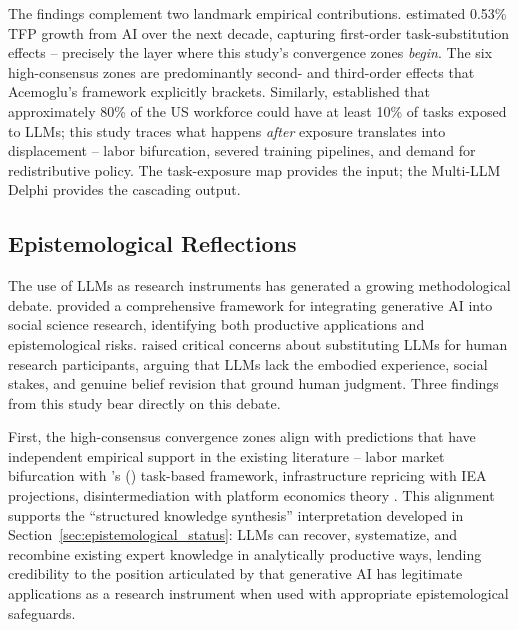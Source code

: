 \documentclass[preprint,review,12pt]{elsarticle}
\begin{document}
The findings complement two landmark empirical contributions. \citet{acemoglu2024simplemacro} estimated 0.53\% TFP growth from AI over the next decade, capturing first-order task-substitution effects -- precisely the layer where this study's convergence zones \textit{begin}. The six high-consensus zones are predominantly second- and third-order effects that Acemoglu's framework explicitly brackets. Similarly, \citet{eloundou2023gpts} established that approximately 80\% of the US workforce could have at least 10\% of tasks exposed to LLMs; this study traces what happens \textit{after} exposure translates into displacement -- labor bifurcation, severed training pipelines, and demand for redistributive policy. The task-exposure map provides the input; the Multi-LLM Delphi provides the cascading output.


\subsection{Epistemological Reflections}
\label{sec:epistemological_reflections}

The use of LLMs as research instruments has generated a growing methodological debate. \citet{bail2024genaisocialscience} provided a comprehensive framework for integrating generative AI into social science research, identifying both productive applications and epistemological risks. \citet{crockett2024llmparticipants} raised critical concerns about substituting LLMs for human research participants, arguing that LLMs lack the embodied experience, social stakes, and genuine belief revision that ground human judgment. Three findings from this study bear directly on this debate.

First, the high-consensus convergence zones align with predictions that have independent empirical support in the existing literature -- labor market bifurcation with \citeauthor{acemoglu2019automation}'s (\citeyear{acemoglu2019automation}) task-based framework, infrastructure repricing with IEA projections, disintermediation with platform economics theory \citep{goldfarb2019digital}. This alignment supports the ``structured knowledge synthesis'' interpretation developed in Section~\ref{sec:epistemological_status}: LLMs can recover, systematize, and recombine existing expert knowledge in analytically productive ways, lending credibility to the position articulated by \citet{bail2024genaisocialscience} that generative AI has legitimate applications as a research instrument when used with appropriate epistemological safeguards.
\end{document}
